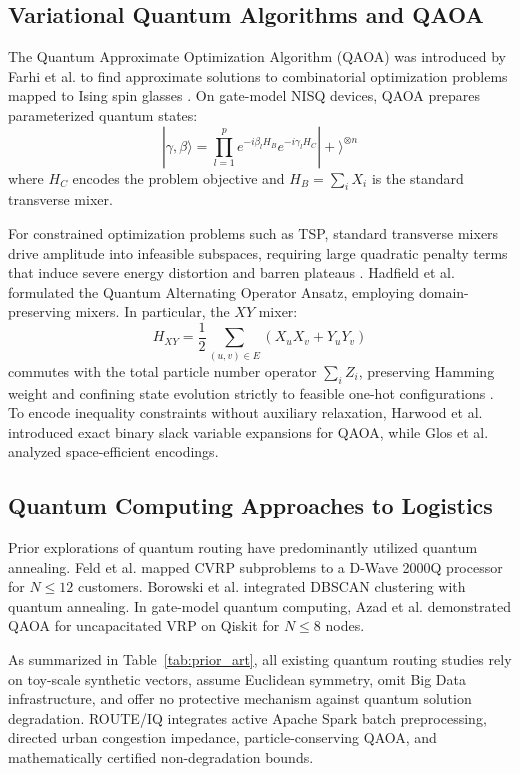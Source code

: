 \documentclass[journal,10pt]{IEEEtran}
\begin{document}
\subsection{Variational Quantum Algorithms and QAOA}
The Quantum Approximate Optimization Algorithm (QAOA) was introduced by Farhi et al. \cite{farhi2014qaoa} to find approximate solutions to combinatorial optimization problems mapped to Ising spin glasses \cite{lucas2014ising}. On gate-model NISQ devices, QAOA prepares parameterized quantum states:
\begin{equation}
|\gamma, \beta\rangle = \prod_{l=1}^p e^{-i \beta_l H_B} e^{-i \gamma_l H_C} |+\rangle^{\otimes n}
\end{equation}
where $H_C$ encodes the problem objective and $H_B = \sum_i X_i$ is the standard transverse mixer.

For constrained optimization problems such as TSP, standard transverse mixers drive amplitude into infeasible subspaces, requiring large quadratic penalty terms that induce severe energy distortion and barren plateaus \cite{mcclean2018barren}. Hadfield et al. \cite{hadfield2019qaoa} formulated the Quantum Alternating Operator Ansatz, employing domain-preserving mixers. In particular, the $XY$ mixer:
\begin{equation}
H_{XY} = \frac{1}{2} \sum_{(u, v) \in E} (X_u X_v + Y_u Y_v)
\end{equation}
commutes with the total particle number operator $\sum_i Z_i$, preserving Hamming weight and confining state evolution strictly to feasible one-hot configurations \cite{wang2020xy}. To encode inequality constraints without auxiliary relaxation, Harwood et al. \cite{harwood2021formulating} introduced exact binary slack variable expansions for QAOA, while Glos et al. \cite{glos2022space} analyzed space-efficient encodings.

\subsection{Quantum Computing Approaches to Logistics}
Prior explorations of quantum routing have predominantly utilized quantum annealing. Feld et al. \cite{feld2019hybrid} mapped CVRP subproblems to a D-Wave 2000Q processor for $N \le 12$ customers. Borowski et al. \cite{borowski2020new} integrated DBSCAN clustering with quantum annealing. In gate-model quantum computing, Azad et al. \cite{azad2022solving} demonstrated QAOA for uncapacitated VRP on Qiskit for $N \le 8$ nodes. 

As summarized in Table~\ref{tab:prior_art}, all existing quantum routing studies rely on toy-scale synthetic vectors, assume Euclidean symmetry, omit Big Data infrastructure, and offer no protective mechanism against quantum solution degradation. ROUTE/IQ integrates active Apache Spark batch preprocessing, directed urban congestion impedance, particle-conserving QAOA, and mathematically certified non-degradation bounds.
\end{document}
